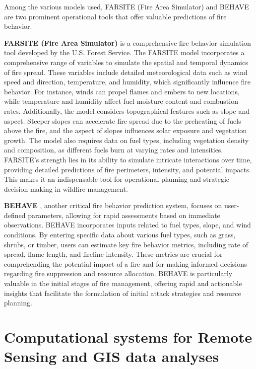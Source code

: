\documentclass[
  12 pt,
]{Nemilov}
\begin{document}
Among the various models used, FARSITE (Fire Area Simulator) and BEHAVE are two prominent operational tools that offer valuable predictions of fire behavior.

\textbf{FARSITE (Fire Area Simulator)} \citep{finney1998farsite} is a comprehensive fire behavior simulation tool developed by the U.S. Forest Service. The FARSITE model incorporates a comprehensive range of variables to simulate the spatial and temporal dynamics of fire spread. These variables include detailed meteorological data such as wind speed and direction, temperature, and humidity, which significantly influence fire behavior. For instance, winds can propel flames and embers to new locations, while temperature and humidity affect fuel moisture content and combustion rates. Additionally, the model considers topographical features such as slope and aspect. Steeper slopes can accelerate fire spread due to the preheating of fuels above the fire, and the aspect of slopes influences solar exposure and vegetation growth. The model also requires data on fuel types, including vegetation density and composition, as different fuels burn at varying rates and intensities. FARSITE's strength lies in its ability to simulate intricate interactions over time, providing detailed predictions of fire perimeters, intensity, and potential impacts. This makes it an indispensable tool for operational planning and strategic decision-making in wildfire management.

\textbf{BEHAVE} \citep{burgan1984behave}, another critical fire behavior prediction system, focuses on user-defined parameters, allowing for rapid assessments based on immediate observations. BEHAVE incorporates inputs related to fuel types, slope, and wind conditions. By entering specific data about various fuel types, such as grass, shrubs, or timber, users can estimate key fire behavior metrics, including rate of spread, flame length, and fireline intensity. These metrics are crucial for comprehending the potential impact of a fire and for making informed decisions regarding fire suppression and resource allocation. BEHAVE is particularly valuable in the initial stages of fire management, offering rapid and actionable insights that facilitate the formulation of initial attack strategies and resource planning.

\section{Computational systems for Remote Sensing and GIS data analyses}\label{computational-systems-for-remote-sensing-and-gis-data-analyses}
\end{document}
